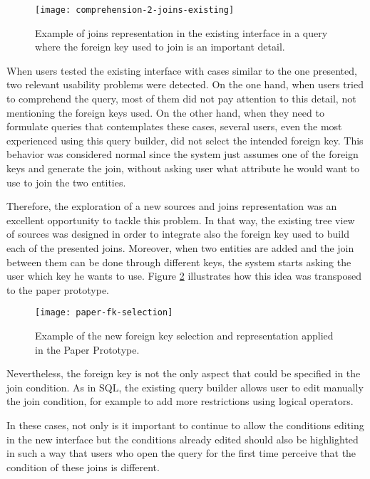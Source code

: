 \begin{figure}[htbp]
	\centering
	\texttt{[image: comprehension-2-joins-existing]}
	\caption{Example of joins representation in the existing interface in a query where the foreign key used to join is an important detail.}
	\label{fig:comprehension2JoinsExisting}
\end{figure}

When users tested the existing interface with cases similar to the one presented, two relevant usability problems were detected. On the one hand, when users tried to comprehend the query, most of them did not pay attention to this detail, not mentioning the foreign keys used. On the other hand, when they need to formulate queries that contemplates these cases, several users, even the most experienced using this query builder, did not select the intended foreign key. This behavior was considered normal since the system just assumes one of the foreign keys and generate the join, without asking user what attribute he would want to use to join the two entities.

Therefore, the exploration of a new sources and joins representation was an excellent opportunity to tackle this problem. In that way, the existing tree view of sources was designed in order to integrate also the foreign key used to build each of the presented joins. Moreover, when two entities are added and the join between them can be done through different keys, the system starts asking the user which key he wants to use. Figure \ref{fig:paperFkSelect} illustrates how this idea was transposed to the paper prototype.

\begin{figure}[htbp]
	\centering
  \texttt{[image: paper-fk-selection]}
	\caption{Example of the new foreign key selection and representation applied in the Paper Prototype.}
	\label{fig:paperFkSelect}
\end{figure}

Nevertheless, the foreign key is not the only aspect that could be specified in the join condition. As in SQL, the existing query builder allows user to edit manually the join condition, for example to add more restrictions using logical operators.

In these cases, not only is it important to continue to allow the conditions editing in the new interface but the conditions already edited should also be highlighted in such a way that users who open the query for the first time perceive that the condition of these joins is different. 

